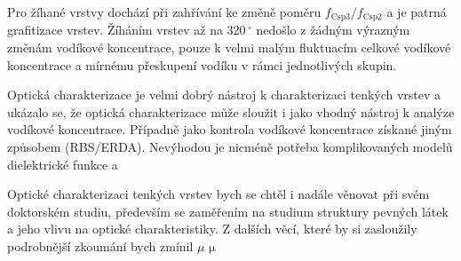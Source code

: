 Pro žíhané vrstvy dochází při zahřívání ke změně poměru $f_\mathrm{Csp3}/f_\mathrm{Csp2}$ a je patrná grafitizace vrstev. Žíháním vrstev až na 320\,$^\circ$ nedošlo z žádným výrazným změnám vodíkové koncentrace, pouze k velmi malým fluktuacím celkové vodíkové koncentrace a mírnému přeskupení vodíku v rámci jednotlivých skupin.

Optická charakterizace je velmi dobrý nástroj k charakterizaci tenkých vrstev a ukázalo se, že optická charakterizace může sloužit i jako vhodný nástroj k analýze vodíkové koncentrace. Případně jako kontrola vodíkové koncentrace získané jiným způsobem (RBS/ERDA). Nevýhodou je nicméně potřeba komplikovaných modelů dielektrické funkce a 

Optické charakterizaci tenkých vrstev bych se chtěl i nadále věnovat při svém doktorském studiu, především se zaměřením na studium struktury pevných látek a jeho vlivu na optické charakteristiky. Z dalších věcí, které by si zasloužily podrobnější zkoumání bych zmínil 
$\mu$ $\mathrm{\mu}$

\cleardoublepage
